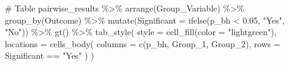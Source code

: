 \documentclass[
  letterpaper,
  DIV=11,
  numbers=noendperiod]{scrartcl}
\newenvironment{Shaded}{\begin{snugshade}}{\end{snugshade}}
\newcommand{\AttributeTok}[1]{\textcolor[rgb]{0.40,0.45,0.13}{#1}}
\newcommand{\CommentTok}[1]{\textcolor[rgb]{0.37,0.37,0.37}{#1}}
\newcommand{\FloatTok}[1]{\textcolor[rgb]{0.68,0.00,0.00}{#1}}
\newcommand{\FunctionTok}[1]{\textcolor[rgb]{0.28,0.35,0.67}{#1}}
\newcommand{\NormalTok}[1]{\textcolor[rgb]{0.00,0.23,0.31}{#1}}
\newcommand{\SpecialCharTok}[1]{\textcolor[rgb]{0.37,0.37,0.37}{#1}}
\newcommand{\StringTok}[1]{\textcolor[rgb]{0.13,0.47,0.30}{#1}}
\begin{document}
\begin{Shaded}
\begin{Highlighting}[]
\CommentTok{\# Table}
\NormalTok{pairwise\_results }\SpecialCharTok{\%\textgreater{}\%} 
    \FunctionTok{arrange}\NormalTok{(Group\_Variable) }\SpecialCharTok{\%\textgreater{}\%}
    \FunctionTok{group\_by}\NormalTok{(Outcome) }\SpecialCharTok{\%\textgreater{}\%}
    \FunctionTok{mutate}\NormalTok{(}\AttributeTok{Significant =} \FunctionTok{ifelse}\NormalTok{(p\_bh }\SpecialCharTok{\textless{}} \FloatTok{0.05}\NormalTok{, }\StringTok{"Yes"}\NormalTok{, }\StringTok{"No"}\NormalTok{)) }\SpecialCharTok{\%\textgreater{}\%}
    \FunctionTok{gt}\NormalTok{() }\SpecialCharTok{\%\textgreater{}\%}
    \FunctionTok{tab\_style}\NormalTok{(}
        \AttributeTok{style =} \FunctionTok{cell\_fill}\NormalTok{(}\AttributeTok{color =} \StringTok{"lightgreen"}\NormalTok{),}
        \AttributeTok{locations =} \FunctionTok{cells\_body}\NormalTok{(}
            \AttributeTok{columns =} \FunctionTok{c}\NormalTok{(p\_bh, Group\_1, Group\_2),}
            \AttributeTok{rows =}\NormalTok{ Significant }\SpecialCharTok{==} \StringTok{"Yes"}
\NormalTok{        )}
\NormalTok{    )}
\end{Highlighting}
\end{Shaded}
\end{document}

